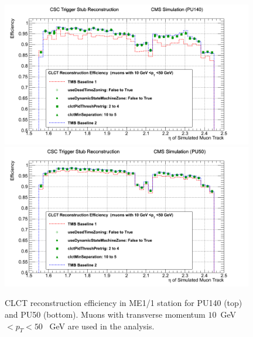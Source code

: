 \begin{figure}[p]
\includegraphics[width=0.98\textwidth]{figures/CLCT_improvements_CLCT_recoEff.png}
\includegraphics[width=0.98\textwidth]{figures/CLCT_improvements_CLCT_recoEff_PU50.png}
\caption{CLCT reconstruction efficiency in ME1/1 station for PU140 (top) and PU50 (bottom). Muons with transverse momentum $10$~GeV$<p_T<50$~ GeV are used in the analysis.}
\label{fig:CLCT_improvements_CLCT_recoEff}
\end{figure}